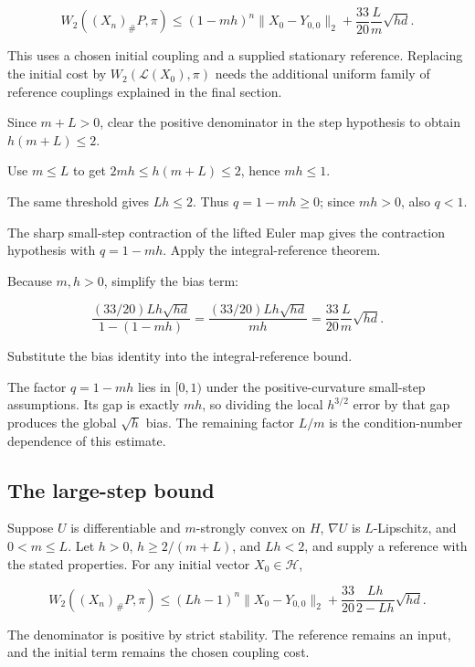 \documentclass[11pt,a4paper]{article}
\begin{document}
\[W_2((X_n)_\#P,\pi)\le(1-mh)^n\|X_0-Y_{0,0}\|_2+\frac{33}{20}\frac Lm\sqrt{hd}.\]

This uses a chosen initial coupling and a supplied stationary reference. Replacing the initial cost by \(W_2(\mathcal L(X_0),\pi)\) needs the additional uniform family of reference couplings explained in the final section.



Since \(m+L>0\), clear the positive denominator in the step hypothesis to obtain \(h(m+L)\le2\).



Use \(m\le L\) to get \(2mh\le h(m+L)\le2\), hence \(mh\le1\).



The same threshold gives \(Lh\le2\). Thus \(q=1-mh\ge0\); since \(mh>0\), also \(q<1\).



The sharp small-step contraction of the lifted Euler map gives the contraction hypothesis with \(q=1-mh\). Apply the integral-reference theorem.



Because \(m,h>0\), simplify the bias term:

\[\frac{(33/20)Lh\sqrt{hd}}{1-(1-mh)}=\frac{(33/20)Lh\sqrt{hd}}{mh}=\frac{33}{20}\frac Lm\sqrt{hd}.\]

Substitute the bias identity into the integral-reference bound.



The factor \(q=1-mh\) lies in \([0,1)\) under the positive-curvature small-step assumptions. Its gap is exactly \(mh\), so dividing the local \(h^{3/2}\) error by that gap produces the global \(\sqrt h\) bias. The remaining factor \(L/m\) is the condition-number dependence of this estimate.


\subsection{\texorpdfstring{The large-step bound}{The large-step bound}}


Suppose \(U\) is differentiable and \(m\)-strongly convex on \(H\), \(\nabla U\) is \(L\)-Lipschitz, and \(0<m\le L\). Let \(h>0\), \(h\ge2/(m+L)\), and \(Lh<2\), and supply a reference with the stated properties. For any initial vector \(X_0\in\mathcal H\),

\[W_2((X_n)_\#P,\pi)\le(Lh-1)^n\|X_0-Y_{0,0}\|_2+\frac{33}{20}\frac{Lh}{2-Lh}\sqrt{hd}.\]

The denominator is positive by strict stability. The reference remains an input, and the initial term remains the chosen coupling cost.
\end{document}
